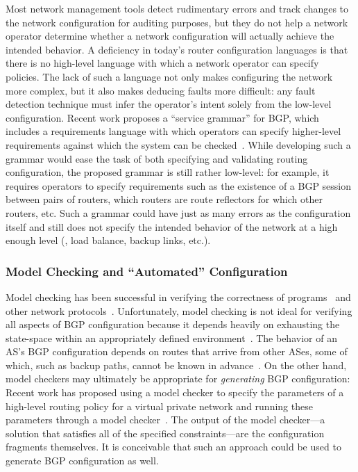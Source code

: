 Most network management tools detect rudimentary errors and track
changes to the network configuration for auditing purposes, but they do
not help a network operator determine whether a network configuration
will actually achieve the intended behavior.  A deficiency in today's
router configuration languages is that there is no high-level language
with which a network operator can specify policies.  The lack of such a
language not only makes configuring the network more complex,
but it also makes deducing faults more difficult: any fault detection
technique must infer the operator's intent solely from the low-level
configuration.  Recent work proposes a ``service grammar'' for BGP,
which includes a requirements language with which operators can specify
higher-level requirements against which the system can be
checked~\cite{Qie2003}.  While developing such a grammar
would ease the task of both specifying and validating routing
configuration, the proposed grammar is still rather low-level: for
example, it requires operators to specify requirements such as the
existence of a BGP session between pairs of routers, which routers are
route reflectors for which other routers, etc.  Such a grammar could
have just as many errors as the configuration itself and still does not
specify the intended behavior of the network at a high enough level
(\eg, load balance, backup links, etc.).

\subsubsection{Model Checking and ``Automated'' Configuration} 

Model checking has been successful in verifying the correctness of
programs~\cite{Godefroid97} and other network
protocols~\cite{Bargavan2002,Hajek78,Musuvathi2004}.  Unfortunately,
model checking is not ideal for verifying all aspects of BGP
configuration because it depends heavily on exhausting the state-space
within an appropriately defined environment~\cite{Musuvathi2003}.  The
behavior of an AS's BGP configuration depends on routes that arrive from
other ASes, some of which, such as backup paths, cannot be known in
advance~\cite{Feamster2003f}.  On the other hand, model checkers may
ultimately be appropriate for {\em generating} BGP configuration: Recent
work has proposed using a model checker to specify the parameters of a
high-level routing policy for a virtual private network and running
these parameters through a model checker~\cite{Narain2004}.  The output
of the model checker---a solution that satisfies all of the specified
constraints---are the configuration fragments themselves.  It is
conceivable that such an approach could be used to generate BGP
configuration as well.

